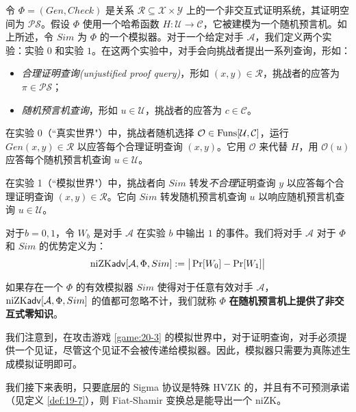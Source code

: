 \begin{game}[非交互式零知识]\label{game:20-3}
令 $\Phi=(Gen,Check)$ 是关系 $\mathcal{R}\subseteq\mathcal{X}\times\mathcal{Y}$ 上的一个非交互式证明系统，其证明空间为 $\mathcal{PS}$。假设 $\Phi$ 使用一个哈希函数 $H:\mathcal{U}\to\mathcal{C}$，它被建模为一个随机预言机。如上所述，令 $Sim$ 为 $\Phi$ 的一个模拟器。对于一个给定对手 $\mathcal{A}$，我们定义两个实验：实验 $0$ 和实验 $1$。在这两个实验中，对手会向挑战者提出一系列查询，形如：
\begin{itemize}
	\item \emph{合理证明查询(unjustified proof query)}，形如 $(x,y)\in\mathcal{R}$，挑战者的应答为 $\pi\in\mathcal{PS}$；
	\item \emph{随机预言机查询}，形如 $u\in\mathcal{U}$，挑战者的应答为 $c\in\mathcal{C}$。
\end{itemize}

在实验 0（``真实世界"）中，挑战者随机选择 $\mathcal{O}\in{\rm Funs}[\mathcal{U},\mathcal{C}]$，运行 $Gen(x,y)\in\mathcal{R}$ 以应答每个合理证明查询 $(x,y)$。它用 $\mathcal O$ 来代替 $H$，用 $\mathcal{O}(u)$ 应答每个随机预言机查询 $u\in\mathcal{U}$。

在实验 1（``模拟世界"）中，挑战者向 $Sim$ 转发\emph{不合理}证明查询 $y$ 以应答每个合理证明查询 $(x,y)\in\mathcal{R}$。它向 $Sim$ 转发随机预言机查询 $u$ 以响应随机预言机查询 $u\in\mathcal{U}$。

对于$b=0,1$，令 $W_b$ 是对手 $\mathcal{A}$ 在实验 $b$ 中输出 $1$ 的事件。我们将对手 $\mathcal{A}$ 对于 $\Phi$ 和 $Sim$ 的优势定义为：
\[
{\rm niZK\mathsf{adv}}[\mathcal{A},\Phi,Sim]:=\big\lvert\Pr[W_0]-\Pr[W_1]\big\rvert
\]
\end{game}

\begin{definition}\label{def:20-5}
如果存在一个 $\Phi$ 的有效模拟器 $Sim$ 使得对于任意有效对手 $\mathcal{A}$，${\rm niZK\mathsf{adv}}[\mathcal{A},\Phi,Sim]$ 的值都可忽略不计，我们就称 $\Phi$ \textbf{在随机预言机上提供了非交互式零知识}。
\end{definition}

我们注意到，在攻击游戏 \ref{game:20-3} 的模拟世界中，对于证明查询，对手必须提供一个见证，尽管这个见证不会被传递给模拟器。因此，模拟器只需要为真陈述生成模拟证明即可。

我们接下来表明，只要底层的 Sigma 协议是特殊 HVZK 的，并且有不可预测承诺（见定义 \ref{def:19-7}），则 Fiat-Shamir 变换总是能导出一个 niZK。

